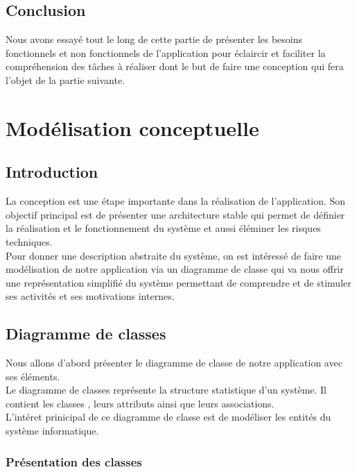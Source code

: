 \documentclass[12]{article}
\begin{document}
\subsection{Conclusion}

 Nous avons essayé tout le long de cette partie de présenter les besoins fonctionnels et non fonctionnels de l'application pour éclaircir et faciliter la compréhension des tâches à réaliser dont le but de faire une conception qui fera l'objet de la partie suivante.





\section{Modélisation conceptuelle}

\subsection{Introduction}

La conception est une étape importante dans la réalisation de l'application. Son objectif principal est de présenter une architecture stable qui permet de définier la réalisation et le fonctionnement du système et aussi éléminer les risques techniques.\\

Pour donner une description abstraite du système, on est intéressé de faire une modélisation de notre application via un diagramme de classe qui va nous offrir une représentation simplifié du système permettant de comprendre et de stimuler ses activités et ses motivations internes.

\subsection{Diagramme de classes}

Nous allons d'abord présenter le diagramme de classe de notre application avec ses éléments.\\

Le diagramme de classes représente la structure statistique d'un système. Il contient les classes , leurs attributs ainsi que leurs associations.\\

L'intéret prinicipal de ce diagramme de classe est de modéliser les entités du système informatique.\\

\subsubsection{Présentation des classes}
\end{document}
